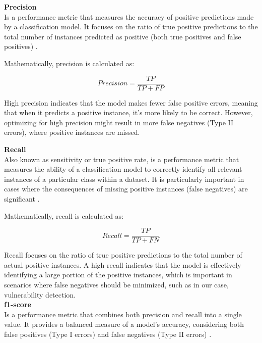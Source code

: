 \textbf{Precision}\\

Is a performance metric that measures the accuracy of positive predictions made by a classification model. It focuses on the ratio of true positive predictions to the total number of instances predicted as positive (both true positives and false positives) \cite{Somogyi2021}.

Mathematically, precision is calculated as:

\begin{equation}\label{Precision_eq}Precision = \frac{TP}{TP + FP}\end{equation}

High precision indicates that the model makes fewer false positive errors, meaning that when it predicts a positive instance, it's more likely to be correct. However, optimizing for high precision might result in more false negatives (Type II errors), where positive instances are missed.

\textbf{Recall}\\

Also known as sensitivity or true positive rate, is a performance metric that measures the ability of a classification model to correctly identify all relevant instances of a particular class within a dataset. It is particularly important in cases where the consequences of missing positive instances (false negatives) are significant \cite{Somogyi2021}.

Mathematically, recall is calculated as:

\begin{equation}\label{Recall_eq}Recall = \frac{TP}{TP + FN}\end{equation}

Recall focuses on the ratio of true positive predictions to the total number of actual positive instances. A high recall indicates that the model is effectively identifying a large portion of the positive instances, which is important in scenarios where false negatives should be minimized, such as in our case, vulnerability detection.\\

\textbf{f1-score}\\

Is a performance metric that combines both precision and recall into a single value. It provides a balanced measure of a model's accuracy, considering both false positives (Type I errors) and false negatives (Type II errors) \cite{Somogyi2021}.

